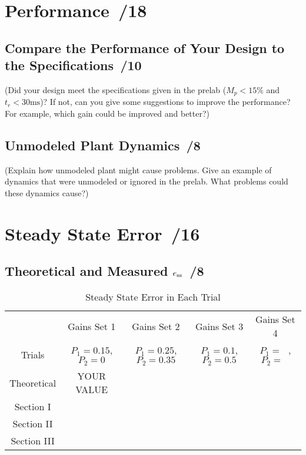 \documentclass{article}
\newcommand{\score}{\hfill \underline{\hspace{0.65cm}}\,/} %
\begin{document}
\section{Performance \score 18}
\subsection{Compare the Performance of Your Design to the Specifications  \score 10}
(Did your design meet the specifications given in the prelab ($M_p < 15\%$ and $t_r < 30 \si{\milli\second}$)? If not, can you give some suggestions to improve the performance? For example, which gain could be improved and better?)
\subsection{Unmodeled Plant Dynamics \score 8}
(Explain how unmodeled plant might cause problems. Give an example of dynamics that were unmodeled or ignored in the prelab. What problems could these dynamics cause?)

\section{Steady State Error \score 16}
\subsection{Theoretical and Measured $e_{\rm ss}$ \score 8}
\begin{table}[phtb]\footnotesize \label{tbl:lab5_q3}
\begin{center}
\caption{Steady State Error in Each Trial}
\begin{tabular}{c|m{1.2cm}|m{1.2cm}|m{1.2cm}|m{1.2cm}|m{1.2cm}|m{1.2cm}|m{1.2cm}|m{1.2cm}} \hline \hline
\cellcolor{lightgray} & \multicolumn{2}{c|}{\cellcolor{lightgray}Gains Set 1} & \multicolumn{2}{c|}{\cellcolor{lightgray}Gains Set 2} & \multicolumn{2}{c|}{\cellcolor{lightgray}Gains Set 3} & \multicolumn{2}{c}{\cellcolor{lightgray}Gains Set 4}\\ \cline{2-9}
\multirow{-2}{*}{\cellcolor{lightgray}Trials}& \multicolumn{2}{c|}{$P_1 = 0.15$, $P_2 = 0$}& \multicolumn{2}{c|}{$P_1 = 0.25$, $P_2 = 0.35$}& \multicolumn{2}{c|}{$P_1 = 0.1$, $P_2 = 0.5$}& \multicolumn{2}{c}{$P_1 = ~~~$, $P_2 = ~~~$}\\ \hline
Theoretical & \multicolumn{2}{c|}{YOUR VALUE} & \multicolumn{2}{c|}{~} & \multicolumn{2}{c|}{~} & \multicolumn{2}{c}{~} \\ \hline
Section I & \multicolumn{2}{c|}{} & \multicolumn{2}{c|}{} & \multicolumn{2}{c|}{} & \multicolumn{2}{c}{} \\ \hline
Section II & \multicolumn{2}{c|}{} & \multicolumn{2}{c|}{} & \multicolumn{2}{c|}{} & \multicolumn{2}{c}{} \\ \hline
Section III & \multicolumn{2}{c|}{} & \multicolumn{2}{c|}{} & \multicolumn{2}{c|}{} & \multicolumn{2}{c}{} \\ \hline
\end{tabular}
\end{center}
\end{table}
\end{document}
